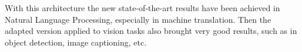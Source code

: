 With this architecture the new state-of-the-art results have been achieved in Natural Language Processing, especially in machine translation.
Then the adapted version applied to vision tasks also brought very good results, such as in object detection, image captioning, etc.
